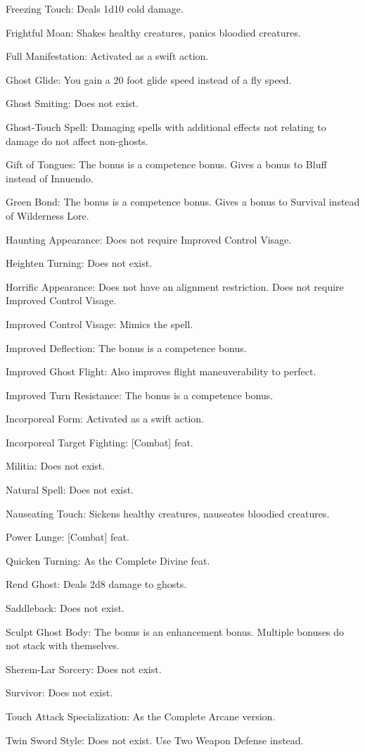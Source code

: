 \begin{itemize*}
\item Freezing Touch: Deals 1d10 cold damage.
\item Frightful Moan: Shakes healthy creatures, panics bloodied creatures.
\item Full Manifestation: Activated as a swift action.
\item Ghost Glide: You gain a 20 foot glide speed instead of a fly speed.
\item Ghost Smiting: Does not exist.
\item Ghost-Touch Spell: Damaging spells with additional effects not relating to damage do not affect non-ghosts.
\item Gift of Tongues: The bonus is a competence bonus. Gives a bonus to Bluff instead of Innuendo.
\item Green Bond: The bonus is a competence bonus. Gives a bonus to Survival instead of Wilderness Lore.
\item Haunting Appearance: Does not require Improved Control Visage.
\item Heighten Turning: Does not exist.
\item Horrific Appearance: Does not have an alignment restriction. Does not require Improved Control Visage.
\item Improved Control Visage: Mimics the  spell.
\item Improved Deflection: The bonus is a competence bonus.
\item Improved Ghost Flight: Also improves flight maneuverability to perfect.
\item Improved Turn Resistance: The bonus is a competence bonus.
\item Incorporeal Form: Activated as a swift action.
\item Incorporeal Target Fighting: [Combat] feat.
\item Militia: Does not exist.
\item Natural Spell: Does not exist.
\item Nauseating Touch: Sickens healthy creatures, nauseates bloodied creatures.
\item Power Lunge: [Combat] feat.
\item Quicken Turning: As the Complete Divine feat.
\item Rend Ghost: Deals 2d8 damage to ghosts.
\item Saddleback: Does not exist.
\item Sculpt Ghost Body: The bonus is an enhancement bonus. Multiple bonuses do not stack with themselves.
\item Sherem-Lar Sorcery: Does not exist.
\item Survivor: Does not exist.
\item Touch Attack Specialization: As the Complete Arcane version.
\item Twin Sword Style: Does not exist. Use Two Weapon Defense instead.
\end{itemize*}

